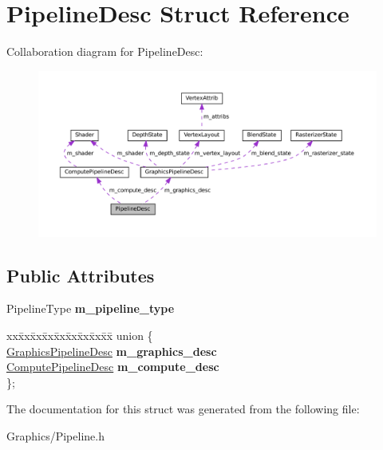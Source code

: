 \hypertarget{structPipelineDesc}{}\section{Pipeline\+Desc Struct Reference}
\label{structPipelineDesc}


Collaboration diagram for Pipeline\+Desc\+:
\nopagebreak
\begin{figure}[H]
\begin{center}
\leavevmode
\includegraphics[width=350pt]{structPipelineDesc__coll__graph}
\end{center}
\end{figure}
\subsection*{Public Attributes}
\begin{DoxyCompactItemize}
\item 
\mbox{\label{structPipelineDesc_ace6e002835a89097082cca46f4dedaa9}} 
Pipeline\+Type {\bfseries m\+\_\+pipeline\+\_\+type}
\item 
\mbox{\label{structPipelineDesc_a8a5b7c3d4a9e26c0b05cdad51dadf1c3}} 
\begin{tabbing}
xx\=xx\=xx\=xx\=xx\=xx\=xx\=xx\=xx\=\kill
union \{\\
\>\hyperlink{structGraphicsPipelineDesc}{GraphicsPipelineDesc} {\bfseries m\_graphics\_desc}\\
\>\hyperlink{structComputePipelineDesc}{ComputePipelineDesc} {\bfseries m\_compute\_desc}\\
\}; \\

\end{tabbing}\end{DoxyCompactItemize}


The documentation for this struct was generated from the following file\+:\begin{DoxyCompactItemize}
\item 
Graphics/Pipeline.\+h\end{DoxyCompactItemize}
